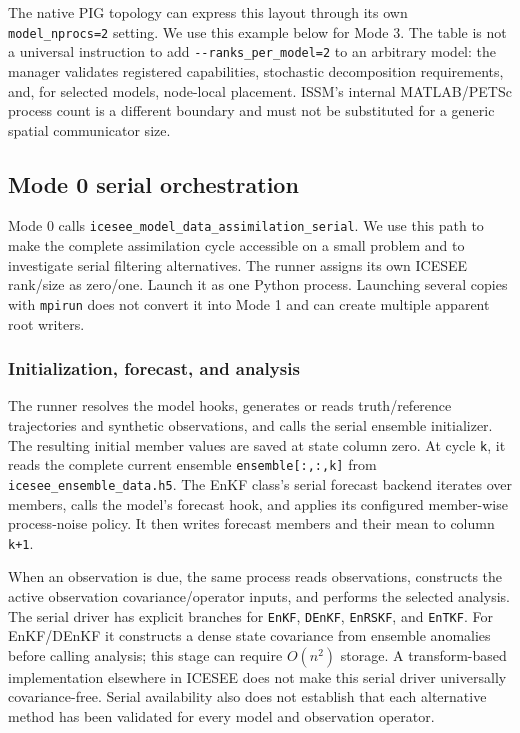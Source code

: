 \documentclass[11pt,a4paper]{article}
\newcommand{\code}[1]{\nolinkurl{#1}}
\begin{document}
The native PIG topology can express this layout through its own \code{model_nprocs=2} setting. We use this example below for Mode 3. The table is not a universal instruction to add \code{--ranks_per_model=2} to an arbitrary model: the manager validates registered capabilities, stochastic decomposition requirements, and, for selected models, node-local placement. ISSM's internal MATLAB/PETSc process count is a different boundary and must not be substituted for a generic spatial communicator size.

\subsection{Mode 0 serial orchestration}

Mode 0 calls \code{icesee_model_data_assimilation_serial}. We use this path to make the complete assimilation cycle accessible on a small problem and to investigate serial filtering alternatives. The runner assigns its own ICESEE rank/size as zero/one. Launch it as one Python process. Launching several copies with \code{mpirun} does not convert it into Mode 1 and can create multiple apparent root writers.

\subsubsection{Initialization, forecast, and analysis}

The runner resolves the model hooks, generates or reads truth/reference trajectories and synthetic observations, and calls the serial ensemble initializer. The resulting initial member values are saved at state column zero. At cycle \code{k}, it reads the complete current ensemble \code{ensemble[:,:,k]} from \code{icesee_ensemble_data.h5}. The EnKF class's serial forecast backend iterates over members, calls the model's forecast hook, and applies its configured member-wise process-noise policy. It then writes forecast members and their mean to column \code{k+1}.

When an observation is due, the same process reads observations, constructs the active observation covariance/operator inputs, and performs the selected analysis. The serial driver has explicit branches for \code{EnKF}, \code{DEnKF}, \code{EnRSKF}, and \code{EnTKF}. For EnKF/DEnKF it constructs a dense state covariance from ensemble anomalies before calling analysis; this stage can require \(O(n^2)\) storage. A transform-based implementation elsewhere in ICESEE does not make this serial driver universally covariance-free. Serial availability also does not establish that each alternative method has been validated for every model and observation operator.
\end{document}
